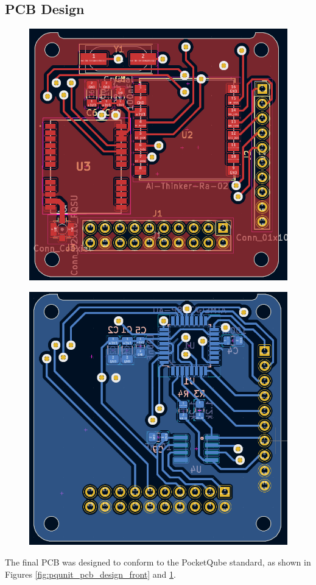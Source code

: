 \subsection{PCB Design}
\begin{figure}[!htb]
  \centering
  \begin{minipage}{.43\textwidth}
    \centering
    \includegraphics[width=.9\linewidth]{pqunit_pcb_design_front}
    \label{fig:pqunit_pcb_design_front}
  \end{minipage}
  \begin{minipage}{.43\textwidth}
    \centering
    \includegraphics[width=.9\linewidth]{pqunit_pcb_design_back}
    \label{fig:pqunit_pcb_design_back}
  \end{minipage}
  \end{figure}

The final PCB was designed to conform to the PocketQube standard, as shown in Figures \ref{fig:pqunit_pcb_design_front} and \ref{fig:pqunit_pcb_design_back}.